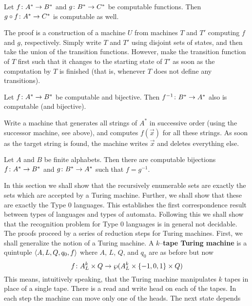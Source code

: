 \begin{lem}
Let $f \colon A^{\ast} \rightarrow B^{\ast}$ and $g \colon B^{\ast} \rightarrow C^{\ast}$
be computable functions. Then $g \circ f \colon A^{\ast} \rightarrow C^{\ast}$
is computable as well.
\end{lem}
The proof is a construction of a machine $U$ from machines $T$ and
$T'$ computing $f$ and $g$, respectively. Simply write $T$ and
$T'$ using disjoint sets of states, and then take the union of
the transition functions. However, make the transition function of
$T$ first such that it changes to the starting state of $T'$ as
soon as the computation by $T$ is finished (that is, whenever $T$ 
does not define any transitions).
\begin{lem}
Let $f \colon A^{\ast} \rightarrow B^{\ast}$ be computable and bijective. Then
$f^{-1} \colon B^{\ast} \rightarrow A^{\ast}$ also is computable (and bijective).
\end{lem}
Write a machine that generates all strings of $A^{\ast}$ in successive
order (using the successor machine, see above), and computes
$f(\vec{x})$ for all these strings. As soon as the target string
is found, the machine writes $\vec{x}$ and deletes everything else.
\begin{lem}
\label{lem:bij}
Let $A$ and $B$ be finite alphabets. Then there are computable
bijections $f \colon A^{\ast} \rightarrow B^{\ast}$ and $g \colon 
B^{\ast} \rightarrow A^{\ast}$ such that $f = g^{-1}$.
\end{lem}
In this section we shall show that the recursively enumerable sets 
are exactly the sets which are accepted  by a Turing machine.
Further, we shall show that these are exactly the Type 0
languages. This establishes the first correspondence result
between types of languages and types of automata. Following
this we shall show that the recognition problem for Type 0
languages is in general not decidable. The proofs proceed
by a series of reduction steps for Turing machines. First,
we shall generalize the notion of a Turing machine.
A $k$--\textbf{tape Turing machine} is a quintuple
$\langle A, L, Q, q_0, f\rangle$ where $A$,
$L$, $Q$, and $q_0$ are as before but now
\begin{equation}
f \colon A_L^k \times Q \rightarrow
    \wp(A_L^k \times \{-1, 0, 1\} \times Q) 
\end{equation}
This means, intuitively speaking, that the Turing machine
manipulates $k$ tapes in place of a single tape. There is
a read and write head on each of the tapes. In each step
the machine can move only one of the heads. The next state depends
